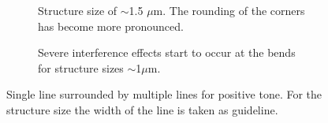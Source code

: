 \begin{figure}[!t]
 \hfill
     \begin{subfigure}[t]{0.24\linewidth}
  	\centering
  	\caption{Structure size of $\sim$1.5 $\mu$m. The rounding of the corners has become more pronounced.}
  	\label{fig:b2d15_q15}
  \end{subfigure}
 \hfill
     \begin{subfigure}[t]{0.24\linewidth}
  	\centering
  	\caption{Severe interference effects start to occur at the bends for structure sizes $\sim$1$\mu$m.}
  	\label{fig:b2d16_q16}
  \end{subfigure}
\caption{Single line surrounded by multiple lines for positive tone. For the structure size the width of the line is taken as guideline.}
 \end{figure}

